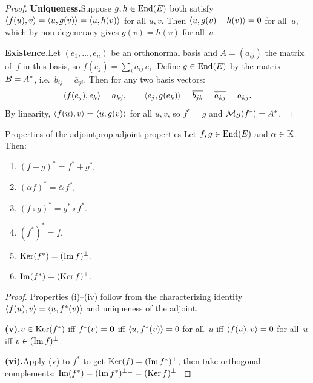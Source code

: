 \begin{proof}
\textbf{Uniqueness.}\quad Suppose $g,h\in\operatorname{End}(E)$ both satisfy
$\langle f(u),v\rangle = \langle u,g(v)\rangle = \langle u,h(v)\rangle$ for all $u,v$.
Then $\langle u,g(v)-h(v)\rangle = 0$ for all~$u$, which by non-degeneracy
gives $g(v) = h(v)$ for all~$v$.

\textbf{Existence.}\quad Let $(e_1,\ldots,e_n)$ be an orthonormal basis
and $A = (a_{ij})$ the matrix of~$f$ in this basis, so
$f(e_j) = \sum_i a_{ij}\, e_i$.  Define $g\in\operatorname{End}(E)$ by the matrix
$B = {A}^{*}$, i.e.\ $b_{ij} = \bar{a}_{ji}$.  Then for any two
basis vectors:
\[
  \langle f(e_j),e_k\rangle = a_{kj},
  \qquad
  \langle e_j,g(e_k)\rangle = \overline{b_{jk}} = \overline{\bar{a}_{kj}}
    = a_{kj}.
\]
By linearity, $\langle f(u),v\rangle = \langle u,g(v)\rangle$ for all $u,v$, so
$f^* = g$ and $\mathcal{M}_{{\mathcal{B}}}(f^*) = {A}^{*}$.
\end{proof}

\begin{proposition}{Properties of the adjoint}{prop:adjoint-properties}
Let $f,g\in\operatorname{End}(E)$ and $\alpha\in{\mathbb{K}}$.  Then:
\begin{enumerate}[label=(\roman*)]
  \item $(f+g)^* = f^* + g^*$.
  \item $(\alpha f)^* = \bar{\alpha}\, f^*$.
  \item $(f\circ g)^* = g^*\circ f^*$.
  \item $(f^*)^* = f$.
  \item $\operatorname{Ker}(f^*) = (\operatorname{Im} f)^{\perp}$.
  \item $\operatorname{Im}(f^*) = (\operatorname{Ker} f)^{\perp}$.
\end{enumerate}
\end{proposition}

\begin{proof}
Properties (i)--(iv) follow from the characterizing identity
$\langle f(u),v\rangle = \langle u,f^*(v)\rangle$ and uniqueness of the adjoint.

\textbf{(v).}\quad $v\in\operatorname{Ker}(f^*)$ iff $f^*(v) = \mathbf{0}$ iff
$\langle u,f^*(v)\rangle = 0$ for all~$u$ iff $\langle f(u),v\rangle = 0$ for all~$u$
iff $v\in(\operatorname{Im} f)^{\perp}$.

\textbf{(vi).}\quad Apply (v) to $f^*$ to get
$\operatorname{Ker}(f) = (\operatorname{Im} f^*)^{\perp}$, then take orthogonal complements:
$\operatorname{Im}(f^*) = (\operatorname{Im} f^*)^{\perp\perp} = (\operatorname{Ker} f)^{\perp}$.
\end{proof}

